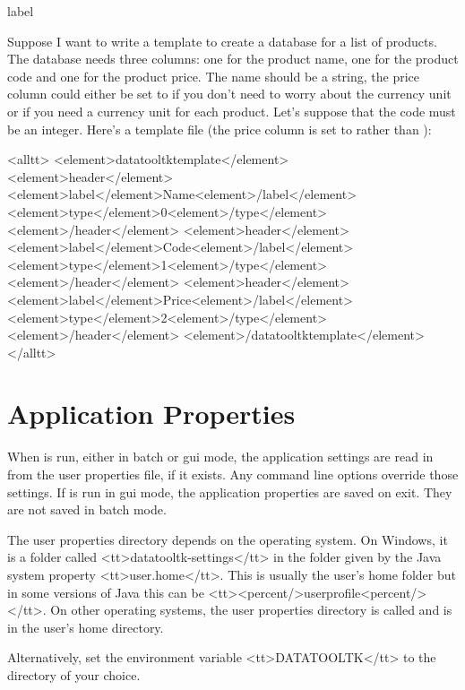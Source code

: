 \begin{example}{label}{}

   Suppose I want to write a template to create a database
   for a list of products. The database needs three columns: one for
   the product name, one for the product code and one for the product price.
   The name should be a string, the price column could either be set
   to  if you don't need to worry about the currency unit
   or  if you need a currency unit for each product.
   Let's suppose that the code must be an integer.
   Here's a template file (the price column is set to 
   rather than ):

<alltt>
<element>datatooltktemplate</element>
  <element>header</element>
    <element>label</element>Name<element>/label</element>
    <element>type</element>0<element>/type</element>
  <element>/header</element>
  <element>header</element>
    <element>label</element>Code<element>/label</element>
    <element>type</element>1<element>/type</element>
  <element>/header</element>
  <element>header</element>
    <element>label</element>Price<element>/label</element>
    <element>type</element>2<element>/type</element>
  <element>/header</element>
<element>/datatooltktemplate</element>
</alltt>
\end{example}

\chapter{Application Properties}\label{sec:preferences}

   When  is run, either in batch or \gls{gui} mode, 
   the application settings are read in from the user properties file, 
   if it exists. Any command line options override those settings.
   If  is run in \gls{gui} mode, the application properties are saved on exit. They are not saved in batch mode.


   The user properties directory depends on the operating system.
   On Windows, it is a folder called <tt>datatooltk-settings</tt>
   in the folder given by the Java system property <tt>user.home</tt>.
   This is usually the user's home folder but in some versions of
   Java this can be <tt><percent/>userprofile<percent/></tt>.
   On other operating systems, the user properties directory is
   called  and is in the user's home directory.


   Alternatively, set the environment variable <tt>DATATOOLTK</tt>
   to the directory of your choice.


